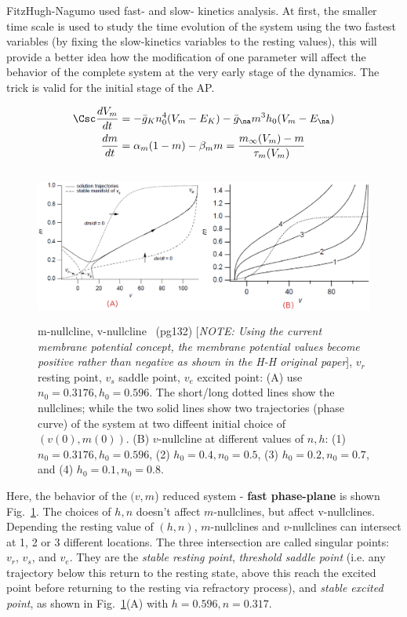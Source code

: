 FitzHugh-Nagumo used fast- and slow- kinetics analysis. At first, the smaller
time scale is used to study the time evolution of the system using the two
fastest variables (by fixing the slow-kinetics variables to the resting values),
this will provide a better idea how the modification of one parameter will
affect the behavior of the complete system at the very early stage of the
dynamics. The trick is valid for the initial stage of the AP. 

\begin{equation}
\begin{split}
\Csc \frac{dV_m}{dt} &= -\bar{g}_K n_0^4 (V_m-E_K)-\bar{g}_\na m^3
h_0(V_m-E_\na)\\
\frac{dm}{dt} &= \alpha_m (1-m) - \beta_m m =
\frac{m_\infty(V_m)-m}{\tau_m(V_m)}
\end{split}
\end{equation}
 
\begin{figure}[hbt]
  \centerline{\includegraphics[height=5cm,
    angle=0]{./images/FN_nullcline.eps}}
  \caption{m-nullcline, v-nullcline~\citep{keener1998mp} (pg132) [{\it NOTE:
  Using the current membrane potential concept, the membrane potential values
  become  positive rather than negative as shown in the H-H original paper}],
  $v_r$ resting point, $v_s$ saddle point, $v_e$ excited point:  
  (A) use $n_0=0.3176, h_0=0.596$. The short/long dotted lines show the
  nullclines; while the two solid lines show two trajectories (phase curve) of
  the system at two diffeent initial choice of $(v(0),m(0))$.   (B)
  $v$-nullcline at different values of $n,h$: (1) $n_0=0.3176,
    h_0=0.596$, (2) $h_0=0.4, n_0=0.5$, (3) $h_0=0.2, n_0=0.7$, and (4)
    $h_0=0.1, n_0=0.8$. }
\label{fig:FN_nullcline}
\end{figure}

Here, the behavior of the $(v,m$) reduced system - {\bf fast phase-plane} is
shown Fig.~\ref{fig:FN_nullcline}. The choices of $h,n$ doesn't affect
$m$-nullclines, but affect v-nullclines. Depending the resting value of $(h,n)$,
$m$-nullclines and $v$-nullclines can intersect at 1, 2 or 3 different
locations. The three intersection are called singular points: $v_r$, $v_s$, and
$v_e$. They are the {\it stable resting point}, {\it threshold saddle point}
(i.e. any trajectory below this return to the resting state, above this reach
the excited point before returning to the resting via refractory process), and
{\it stable excited point}, as shown in Fig.~\ref{fig:FN_nullcline}(A) with
$h=0.596, n=0.317$. 

